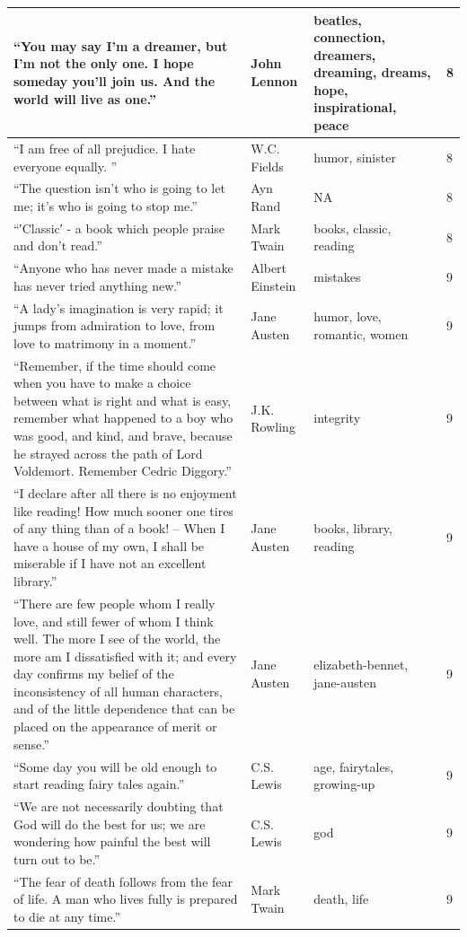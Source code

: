 \documentclass[
  letterpaper,
  DIV=11,
  numbers=noendperiod]{scrreprt}
\begin{document}
\begin{tabular}[t]{l|l|l|l}
\hline
“You may say I'm a dreamer, but I'm not the only one. I hope someday you'll join us. And the world will live as one.” & John Lennon & beatles, connection, dreamers, dreaming, dreams, hope, inspirational, peace & 8\\
\hline
“I am free of all prejudice. I hate everyone equally. ” & W.C. Fields & humor, sinister & 8\\
\hline
“The question isn't who is going to let me; it's who is going to stop me.” & Ayn Rand & NA & 8\\
\hline
“′Classic′ - a book which people praise and don't read.” & Mark Twain & books, classic, reading & 8\\
\hline
“Anyone who has never made a mistake has never tried anything new.” & Albert Einstein & mistakes & 9\\
\hline
“A lady's imagination is very rapid; it jumps from admiration to love, from love to matrimony in a moment.” & Jane Austen & humor, love, romantic, women & 9\\
\hline
“Remember, if the time should come when you have to make a choice between what is right and what is easy, remember what happened to a boy who was good, and kind, and brave, because he strayed across the path of Lord Voldemort. Remember Cedric Diggory.” & J.K. Rowling & integrity & 9\\
\hline
“I declare after all there is no enjoyment like reading! How much sooner one tires of any thing than of a book! -- When I have a house of my own, I shall be miserable if I have not an excellent library.” & Jane Austen & books, library, reading & 9\\
\hline
“There are few people whom I really love, and still fewer of whom I think well. The more I see of the world, the more am I dissatisfied with it; and every day confirms my belief of the inconsistency of all human characters, and of the little dependence that can be placed on the appearance of merit or sense.” & Jane Austen & elizabeth-bennet, jane-austen & 9\\
\hline
“Some day you will be old enough to start reading fairy tales again.” & C.S. Lewis & age, fairytales, growing-up & 9\\
\hline
“We are not necessarily doubting that God will do the best for us; we are wondering how painful the best will turn out to be.” & C.S. Lewis & god & 9\\
\hline
“The fear of death follows from the fear of life. A man who lives fully is prepared to die at any time.” & Mark Twain & death, life & 9\\

\end{tabular}
\end{document}
